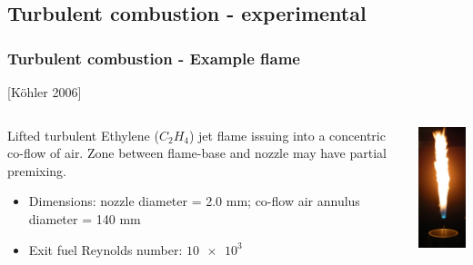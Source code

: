\documentclass{beamer}
\begin{document}
\subsection[experimental]{Turbulent combustion - experimental}
\begin{frame}%
\frametitle{Turbulent combustion - Example flame}
\scriptsize
[K{\"o}hler 2006] \cite{Kohler, AdelaideISF}
\begin{minipage}[0.5\textheight]{\textwidth}
\begin{columns}[T]
\begin{column}{0.65\textwidth}
\vspace{10pt}

\tiny{Lifted turbulent Ethylene ($C_2H_4$) jet flame issuing into a concentric co-flow of air.
Zone between flame-base and nozzle may have partial premixing.  }
\begin{itemize}%
\tiny
\item Dimensions: nozzle diameter = 2.0 mm; co-flow air annulus diameter = 140 mm\\
\item Exit fuel Reynolds number: $\num{10e3}$
\end{itemize}
\end{column}
\begin{column}{0.3\textwidth}
\vspace{0pt}
\includegraphics[height=0.7\textwidth]{./figs/dlrflame.png}
\end{column}
\end{columns}
\end{minipage}


\end{frame}
\end{document}
